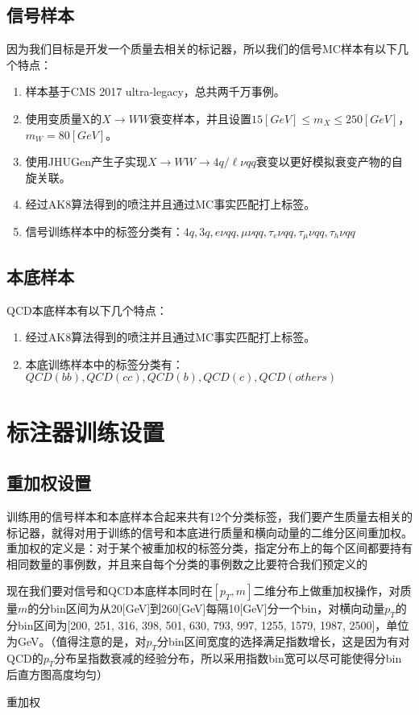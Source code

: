 \subsection{信号样本}
因为我们目标是开发一个质量去相关的标记器，所以我们的信号MC样本有以下几个特点：
\begin{enumerate}
    \item 样本基于CMS 2017 ultra-legacy，总共两千万事例。
    \item 使用变质量X的$X\to WW$衰变样本，并且设置$15 [\si{GeV}]\leq m_X\leq 250[\si{GeV}]$，$m_W=80[\si{GeV}]$。
    \item 使用JHUGen产生子实现$X\to WW\to4q/\ell \nu qq$衰变以更好模拟衰变产物的自旋关联。
    \item 经过AK8算法得到的喷注并且通过MC事实匹配打上标签。
    \item 信号训练样本中的标签分类有：\(4q,3q,e\nu qq,\mu\nu qq,\tau_e\nu qq,\tau_\mu\nu qq, \tau_h\nu qq\)
\end{enumerate}

\subsection{本底样本}
QCD本底样本有以下几个特点：
\begin{enumerate}
    \item 经过AK8算法得到的喷注并且通过MC事实匹配打上标签。
    \item 本底训练样本中的标签分类有：\(QCD(bb),QCD(cc),QCD(b),QCD(c),QCD(others)\)
\end{enumerate}

\section{标注器训练设置}
\subsection{重加权设置}
训练用的信号样本和本底样本合起来共有12个分类标签，我们要产生质量去相关的标记器，就得对用于训练的信号和本底进行质量和横向动量的二维分区间重加权。重加权的定义是：对于某个被重加权的标签分类，指定分布上的每个区间都要持有相同数量的事例数，并且来自每个分类的事例数之比要符合我们预定义的

现在我们要对信号和QCD本底样本同时在$[p_T,m]$二维分布上做重加权操作，对质量$m$的分bin区间为从20[GeV]到260[GeV]每隔10[GeV]分一个bin，对横向动量$p_T$的分bin区间为[200, 251, 316, 398, 501, 630, 793, 997, 1255, 1579, 1987, 2500]，单位为GeV。（值得注意的是，对$p_T$分bin区间宽度的选择满足指数增长，这是因为有对QCD的$p_T$分布呈指数衰减的经验分布，所以采用指数bin宽可以尽可能使得分bin后直方图高度均匀）

重加权
